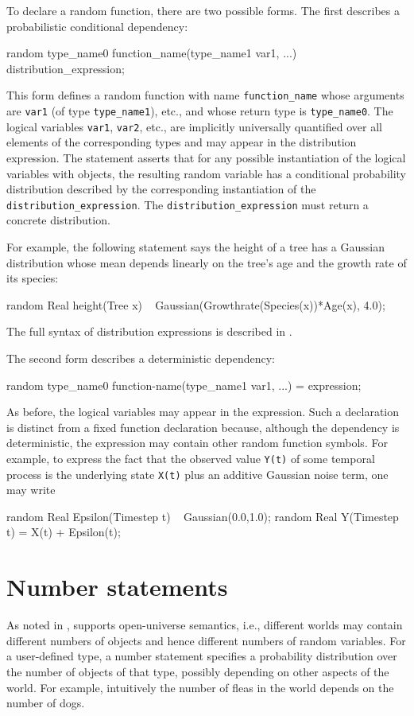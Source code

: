 \documentclass[12pt]{article}
\begin{document}
To declare a random function, there are two possible forms. The first describes a probabilistic
conditional dependency:
\begin{blogcode}
random type_name0 function_name(type_name1 var1, ...) ~ 
  distribution_expression;
\end{blogcode}
This form defines a random function with name \texttt{function\_name} whose arguments are {\tt var1} (of type \verb|type_name1|), etc.,
and whose return type is \verb|type_name0|. The logical variables {\tt var1}, {\tt var2}, etc., are implicitly universally quantified over
all elements of the corresponding types and may appear in the distribution expression. The statement asserts that for any possible instantiation of the
logical variables with objects, the resulting random variable has a conditional probability distribution
described by the corresponding instantiation of the {\tt distribution\_expression}. The {\tt distribution\_expression} must return a concrete distribution. 

For example, the following statement says the height of a tree has a Gaussian distribution
whose mean depends linearly on the tree's age and the growth rate of its species:
\begin{blogcode}
random Real height(Tree x) ~ Gaussian(Growthrate(Species(x))*Age(x), 4.0);
\end{blogcode}
The full syntax of distribution expressions is described in .

The second form describes a deterministic dependency:
\begin{blogcode}
random type_name0 function-name(type_name1 var1, ...) = expression;
\end{blogcode}
As before, the logical variables may appear in the expression.
Such a declaration is distinct from a fixed function declaration because, although the dependency is deterministic,
the expression may contain other random function symbols. For example, 
to express the fact that the observed value {\tt Y(t)} of some temporal process 
is the underlying state {\tt X(t)} plus an additive Gaussian noise term, one may write
\begin{blogcode}
random Real Epsilon(Timestep t) ~ Gaussian(0.0,1.0);
random Real Y(Timestep t) = X(t) + Epsilon(t);
\end{blogcode}




\section{Number statements}\label{number-section}
As noted in , \bl supports open-universe semantics, i.e., different worlds may contain different numbers of objects and hence different numbers of random variables.
For a user-defined type, a number statement specifies a probability distribution over the number of objects of that type, possibly depending
on other aspects of the world. For example, intuitively the number of fleas in the world depends on the number of dogs.
\end{document}
